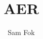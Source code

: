 \documentclass{article}
\begin{document}
\title{AER}
\author{Sam Fok}

\maketitle







\end{document}
